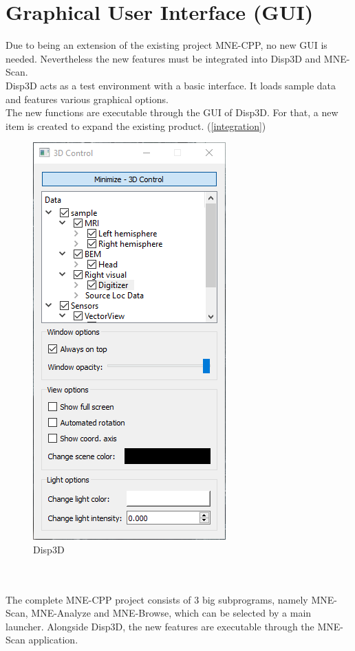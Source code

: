 \section{Graphical User Interface (GUI)}

Due to being an extension of the existing project MNE-CPP, no new GUI is needed. Nevertheless the new features must be integrated into Disp3D and MNE-Scan. \\

Disp3D acts as a test environment with a basic interface. It loads sample data and features various graphical options. \\
The new functions are executable through the GUI of Disp3D. For that, a new item is created to expand the existing product. (\ref{integration}) \\ 
	
\begin{figure}
	
	\begin{center}
		
		\includegraphics[scale=0.5]{Figures/Disp3D.png}
	
	\end{center}
	
	\caption{Disp3D}

\end{figure}
~\\
~\\
The complete MNE-CPP project consists of 3 big subprograms, namely MNE-Scan, MNE-Analyze and MNE-Browse, which can be selected by a main launcher. Alongside Disp3D, the new features are executable through the MNE-Scan application.


